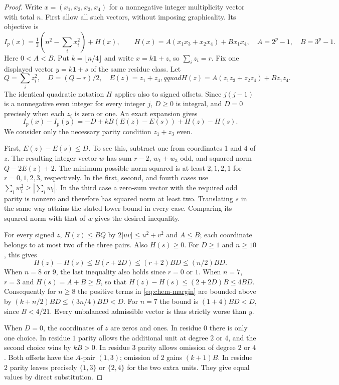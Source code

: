 \documentclass[11pt,a4paper]{article}
\theoremstyle{definition}\newtheorem{problem}[theorem]{Problem}
\begin{document}
\begin{proof}
Write $x=(x_1,x_2,x_3,x_4)$ for a nonnegative integer multiplicity vector
with total $n$. First allow all such vectors, without imposing graphicality.
Its objective is
\[
 I_p(x)=\tfrac12(n^2-\textstyle\sum_i x_i^2)+H(x),\qquad
 H(x)=A(x_1x_3+x_2x_4)+B x_1x_4,
 \quad A=2^p-1,\quad B=3^p-1.
\]
Here $0<A<B$. Put $k=\lfloor n/4\rfloor$ and write $x=k\mathbf{1}+z$, so
$\sum_i z_i=r$. Fix one displayed vector $y=k\mathbf{1}+s$ of the same
residue class. Let
\[
 Q=\sum_i z_i^2,\quad D=(Q-r)/2,\quad E(z)=z_1+z_4,qquad
 H(z)=A(z_1z_3+z_2z_4)+Bz_1z_4.
\]
The identical quadratic notation $H$ applies also to signed offsets.
Since $j(j-1)$ is a nonnegative even integer for every integer $j$,
$D\ge0$ is integral, and $D=0$ precisely when each $z_i$ is zero or
one. An exact expansion gives
\begin{equation}\label{eq:chem-margin}
 I_p(x)-I_p(y)=-D+kB(E(z)-E(s))+H(z)-H(s).
\end{equation}
We consider only the necessary parity condition $z_1+z_3$ even.

First, $E(z)-E(s)\le D$. To see this, subtract one from coordinates
1 and 4 of $z$. The resulting integer vector $w$ has sum $r-2$,
$w_1+w_3$ odd, and squared norm $Q-2E(z)+2$. The minimum possible norm
squared is at least $2,1,2,1$ for $r=0,1,2,3$, respectively. In the
first, second, and fourth cases use $\sum_i w_i^2\ge|\sum_i w_i|$.
In the third case a zero-sum vector with the required odd parity is
nonzero and therefore has squared norm at least two.
Translating $s$ in the same way attains the stated lower bound in every
case. Comparing its squared norm with that of $w$ gives the desired
inequality.

For every signed $z$,
$H(z)\le BQ$ by $2|uv|\le u^2+v^2$ and $A\le B$; each coordinate
belongs to at most two of the three pairs. Also $H(s)\ge0$. For
$D\ge1$ and $n\ge10$, this gives
\[
 H(z)-H(s)\le B(r+2D)\le (r+2)BD\le (n/2)BD.
\]
When $n=8$ or $9$, the last inequality also holds since $r=0$ or $1$.
When $n=7$, $r=3$ and $H(s)=A+B\ge B$, so that
$H(z)-H(s)\le(2+2D)B\le4BD$.
Consequently for $n\ge8$ the positive terms in
\eqref{eq:chem-margin} are bounded above by
$(k+n/2)BD\le(3n/4)BD<D$. For $n=7$ the bound is $(1+4)BD<D$,
since $B<4/21$. Every unbalanced admissible vector is thus strictly
worse than $y$.

When $D=0$, the coordinates of $z$ are zeros and ones. In residue $0$
there is only one choice. In residue $1$ parity allows the additional
unit at degree $2$ or $4$, and the second choice wins by $kB>0$.
In residue $3$ parity allows omission of degree $2$ or $4$. Both
offsets have the $A$-pair $(1,3)$; omission of $2$ gains $(k+1)B$.
In residue $2$ parity leaves precisely $\{1,3\}$ or $\{2,4\}$ for
the two extra units. They give equal values by direct substitution.


\end{proof}
\end{document}
